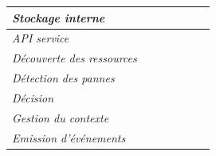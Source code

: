 \begin{table}[h!]
\begin{tabular}{|l|l|l|l|l|l|l|}
		\textit{Stockage interne}                            &                                                                                       &                           & \checkmark                                                                 &                       &                                                                   &                    \\ \hline
		\textit{API service}                                 & \checkmark                                                                            &                           & \checkmark                                                                 &                       &                                                                   &                    \\ \hline
		\hline
		\textit{Découverte des ressources}                   &                                                                                       &                           &                                                                            & \checkmark            &                                                                   &                    \\ \hline
		\textit{Détection des pannes}                        &                                                                                       &                           & \checkmark                                                                 &                       &                                                                   &                    \\ \hline
		\textit{Décision}                                    &                                                                                       &                           &                                                                            & \checkmark            &                                                                   &                    \\ \hline
		\textit{Gestion du contexte}                         &                                                                                       &                           &                                                                            &                       & \checkmark                                                        &                    \\ \hline
		\textit{Emission d'événements}                       &                                                                                       &                           & \checkmark                                                                 &                       &                                                                   & \checkmark         \\ \hline

\end{tabular}
\end{table}
